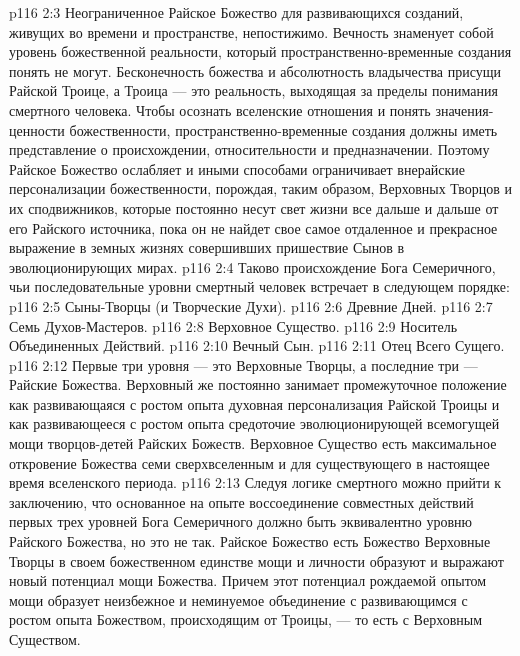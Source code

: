\vs p116 2:3 \pc Неограниченное Райское Божество для развивающихся созданий, живущих во времени и пространстве, непостижимо. Вечность знаменует собой уровень божественной реальности, который пространственно\hyp{}временные создания понять не могут. Бесконечность божества и абсолютность владычества присущи Райской Троице, а Троица --- это реальность, выходящая за пределы понимания смертного человека. Чтобы осознать вселенские отношения и понять значения\hyp{}ценности божественности, пространственно\hyp{}временные создания должны иметь представление о происхождении, относительности и предназначении. Поэтому Райское Божество ослабляет и иными способами ограничивает внерайские персонализации божественности, порождая, таким образом, Верховных Творцов и их сподвижников, которые постоянно несут свет жизни все дальше и дальше от его Райского источника, пока он не найдет свое самое отдаленное и прекрасное выражение в земных жизнях совершивших пришествие Сынов в эволюционирующих мирах.
\vs p116 2:4 Таково происхождение Бога Семеричного, чьи последовательные уровни смертный человек встречает в следующем порядке:
\vs p116 2:5 \bibnobreakspace Сыны\hyp{}Творцы (и Творческие Духи).
\vs p116 2:6 \bibnobreakspace Древние Дней.
\vs p116 2:7 \bibnobreakspace Семь Духов\hyp{}Мастеров.
\vs p116 2:8 \bibnobreakspace Верховное Существо.
\vs p116 2:9 \bibnobreakspace Носитель Объединенных Действий.
\vs p116 2:10 \bibnobreakspace Вечный Сын.
\vs p116 2:11 \bibnobreakspace Отец Всего Сущего.
\vs p116 2:12 \pc Первые три уровня --- это Верховные Творцы, а последние три --- Райские Божества. Верховный же постоянно занимает промежуточное положение как развивающаяся с ростом опыта духовная персонализация Райской Троицы и как развивающееся с ростом опыта средоточие эволюционирующей всемогущей мощи творцов\hyp{}детей Райских Божеств. Верховное Существо есть максимальное откровение Божества семи сверхвселенным и для существующего в настоящее время вселенского периода.
\vs p116 2:13 Следуя логике смертного можно прийти к заключению, что основанное на опыте воссоединение совместных действий первых трех уровней Бога Семеричного должно быть эквивалентно уровню Райского Божества, но это не так. Райское Божество есть Божество  Верховные Творцы в своем божественном единстве мощи и личности образуют и выражают новый потенциал мощи  Божества. Причем этот потенциал рождаемой опытом мощи образует неизбежное и неминуемое объединение с развивающимся с ростом опыта Божеством, происходящим от Троицы, --- то есть с Верховным Существом.
